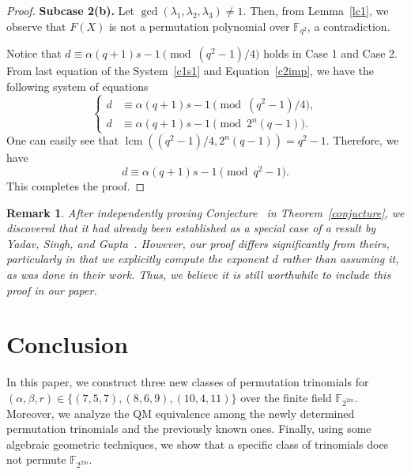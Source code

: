 \documentclass[12pt,reqno]{amsart}
\newtheorem{rmk}[thm]{Remark}
\numberwithin{equation}{section}
\theoremstyle{definition}
\DeclareMathOperator{\lcm}{lcm}
\newcommand{\F}{\mathbb F}
\begin{document}
\begin{proof}
    
\textbf{Subcase 2(b).} Let $\gcd(\lambda_{1},\lambda_{2}, \lambda_{3}) \neq 1$. Then, from Lemma~\ref{lc1}, we observe that $F(X)$ is not a permutation polynomial over $\F_{q^2}$, a contradiction.
	
Notice that $d\equiv \alpha(q+1)s-1 \pmod{(q^2-1)/4}$ holds in Case 1 and Case 2. From last equation of the System~\eqref{c1s1} and Equation~\eqref{c2imp}, we have the following system of equations
\begin{equation*}
\begin{cases}
d & \equiv \alpha (q+1)s-1 \pmod {(q^2-1)/4}, \\
d & \equiv \alpha (q+1)s-1 \pmod {2^n(q-1)}.
\end{cases}
\end{equation*}
One can easily see that $\lcm((q^2-1)/4,2^n(q-1))=q^2-1.$ Therefore, we have
\begin{equation*}
d\equiv \alpha(q+1)s-1 \pmod{q^2-1}.
\end{equation*} 
This completes the proof.
\end{proof}

\begin{rmk}
After independently proving Conjecture~\cite[Conjecture 1]{Harsh} in Theorem~\ref{conjucture}, we discovered that it had already been established as a special case of a result by Yadav, Singh, and Gupta~\cite[Theorem 3.3]{Yadav}. However, our proof differs significantly from theirs, particularly in that we explicitly compute the exponent $d$ rather than assuming it, as was done in their work. Thus, we believe it is still worthwhile to include this proof in our paper.
\end{rmk}

\section{Conclusion}\label{S7}
In this paper, we construct three new classes of permutation trinomials for $(\alpha,\beta, r) \in \{ (7,5,7), (8,6,9), (10,4,11) \}$ over the finite field $\F_{2^{2m}}$.  Moreover,  we analyze the QM equivalence among the newly determined permutation trinomials and the previously known ones. Finally, using some algebraic geometric techniques, we show that a specific class of trinomials does not permute $\F_{2^{2m}}$.
\end{document}
